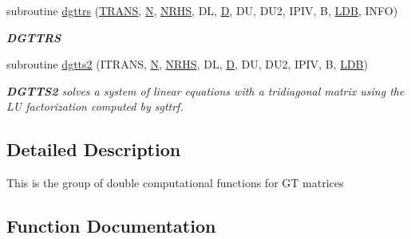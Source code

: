 \begin{DoxyCompactItemize}
subroutine \hyperlink{group__doubleGTcomputational_ga887f9fe1a0c6a4aeac1752da5652014a}{dgttrs} (\hyperlink{superlu__enum__consts_8h_a0c4e17b2d5cea33f9991ccc6a6678d62a1f61e3015bfe0f0c2c3fda4c5a0cdf58}{T\+R\+A\+N\+S}, \hyperlink{polmisc_8c_a0240ac851181b84ac374872dc5434ee4}{N}, \hyperlink{example__user_8c_aa0138da002ce2a90360df2f521eb3198}{N\+R\+H\+S}, D\+L, \hyperlink{odrpack_8h_a7dae6ea403d00f3687f24a874e67d139}{D}, D\+U, D\+U2, I\+P\+I\+V, B, \hyperlink{example__user_8c_a50e90a7104df172b5a89a06c47fcca04}{L\+D\+B}, I\+N\+F\+O)
\begin{DoxyCompactList}\small\item\em {\bfseries D\+G\+T\+T\+R\+S} \end{DoxyCompactList}\item 
subroutine \hyperlink{group__doubleGTcomputational_gaeb6c61ebd5c7f9942cb364d6cb2ae1fb}{dgtts2} (I\+T\+R\+A\+N\+S, \hyperlink{polmisc_8c_a0240ac851181b84ac374872dc5434ee4}{N}, \hyperlink{example__user_8c_aa0138da002ce2a90360df2f521eb3198}{N\+R\+H\+S}, D\+L, \hyperlink{odrpack_8h_a7dae6ea403d00f3687f24a874e67d139}{D}, D\+U, D\+U2, I\+P\+I\+V, B, \hyperlink{example__user_8c_a50e90a7104df172b5a89a06c47fcca04}{L\+D\+B})
\begin{DoxyCompactList}\small\item\em {\bfseries D\+G\+T\+T\+S2} solves a system of linear equations with a tridiagonal matrix using the L\+U factorization computed by sgttrf. \end{DoxyCompactList}\end{DoxyCompactItemize}


\subsection{Detailed Description}
This is the group of double computational functions for G\+T matrices 

\subsection{Function Documentation}
\hypertarget{group__doubleGTcomputational_ga55242c56fbb3243e6c9b897880182a4b}{}
